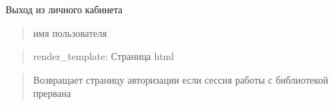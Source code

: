 \documentclass[letterpaper,10pt,russian]{sphinxmanual}
\begin{document}
\begin{fulllineitems}
\label{\detokenize{blueprints:blueprints.auth.exit}}
\pysigstartsignatures
{}
\pysigstopsignatures
\sphinxAtStartPar
Выход из личного кабинета
\begin{description}
\begin{quote}\begin{description}
\sphinxAtStartPar
имя пользователя

\end{description}\end{quote}

\end{description}
\begin{quote}\begin{description}
\sphinxAtStartPar
render\_template:  Страница html

\end{description}\end{quote}
\begin{description}
\begin{quote}\begin{description}
\sphinxAtStartPar
Возвращает страницу авторизации если сессия работы с библиотекой прервана

\end{description}\end{quote}

\end{description}

\end{fulllineitems}

\end{document}
